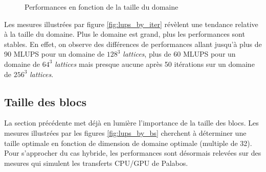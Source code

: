 \begin{figure}[H]
	\centering
	\caption{Performances en fonction de la taille du domaine}
	\label{fig:domain_size_bs}
\end{figure}

Les mesures illustrées par figure \ref{fig:lups_by_iter} révèlent une tendance relative à la taille du domaine. Plus le domaine est grand, plus les performances sont stables. En effet, on observe des différences de performances allant jusqu'à plus de 90 \acs{MLUPS} pour un domaine de $128^3$ \textit{lattices}, plus de 60 \acs{MLUPS} pour un domaine de $64^3$ \textit{lattices} mais presque aucune après 50 itérations sur un domaine de $256^3$ \textit{lattices}.

\subsection{Taille des blocs}
La section précédente met déjà en lumière l'importance de la taille des blocs. Les mesures illustrées par les figures \ref{fig:lups_by_bs} cherchent à déterminer une taille optimale en fonction de dimension de domaine optimale (multiple de 32). Pour s'approcher du cas hybride, les performances sont désormais relevées sur des mesures qui simulent les transferts \acs{CPU}/\acs{GPU} de Palabos.


